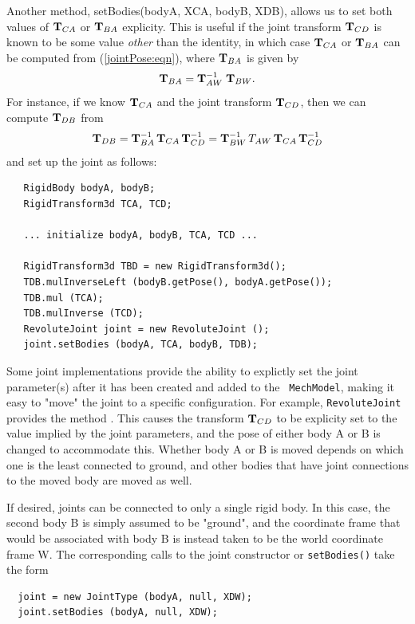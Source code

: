 Another method,
{setBodies(bodyA, XCA, bodyB, XDB)}, allows us to set both values of
${\bf T}_{CA}$ or ${\bf T}_{BA}$ explicity. This is useful if the joint
transform ${\bf T}_{CD}$ is known to be some value {\it other} than the
identity, in which case ${\bf T}_{CA}$ or ${\bf T}_{BA}$ can be computed
from (\ref{jointPose:eqn}), where ${\bf T}_{BA}$ is given by
%
\begin{equation}
{\bf T}_{BA} = {\bf T}_{AW}^{-1} \; {\bf T}_{BW}.
\end{equation}
%
For instance, if we know ${\bf T}_{CA}$ and the joint transform ${\bf T}_{CD}$,
then we can compute ${\bf T}_{DB}$
from
%
\begin{equation}
{\bf T}_{DB} = {\bf T}_{BA}^{-1} \, {\bf T}_{CA} \, {\bf T}_{CD}^{-1} = 
{\bf T}_{BW}^{-1}  \, T_{AW} \, {\bf T}_{CA} \, {\bf T}_{CD}^{-1}
\end{equation}
%
and set up the joint as follows:
%
\begin{lstlisting}
   RigidBody bodyA, bodyB;
   RigidTransform3d TCA, TCD;

   ... initialize bodyA, bodyB, TCA, TCD ...
   
   RigidTransform3d TBD = new RigidTransform3d();
   TDB.mulInverseLeft (bodyB.getPose(), bodyA.getPose());
   TDB.mul (TCA);
   TDB.mulInverse (TCD);
   RevoluteJoint joint = new RevoluteJoint ();
   joint.setBodies (bodyA, TCA, bodyB, TDB);
\end{lstlisting}
%

Some joint implementations provide the ability to explictly set the
joint parameter(s) after it has been created and added to the {\tt
MechModel}, making it easy to "move" the joint to a specific
configuration. For example, {\tt RevoluteJoint} provides the method
.
This causes the transform ${\bf T}_{CD}$ to be explicity set to the value
implied by the joint parameters, and the pose of either body A or B is
changed to accommodate this. Whether body A or B is moved depends on
which one is the least connected to ground, and other bodies that have
joint connections to the moved body are moved as well.

If desired, joints can be connected to only a single rigid body. In
this case, the second body B is simply assumed to be "ground", and the
coordinate frame that would be associated with body B is instead taken
to be the world coordinate frame W. The corresponding calls
to the joint constructor or {\tt setBodies()} take the
form
%
\begin{lstlisting}
  joint = new JointType (bodyA, null, XDW);
  joint.setBodies (bodyA, null, XDW);
\end{lstlisting}
%

